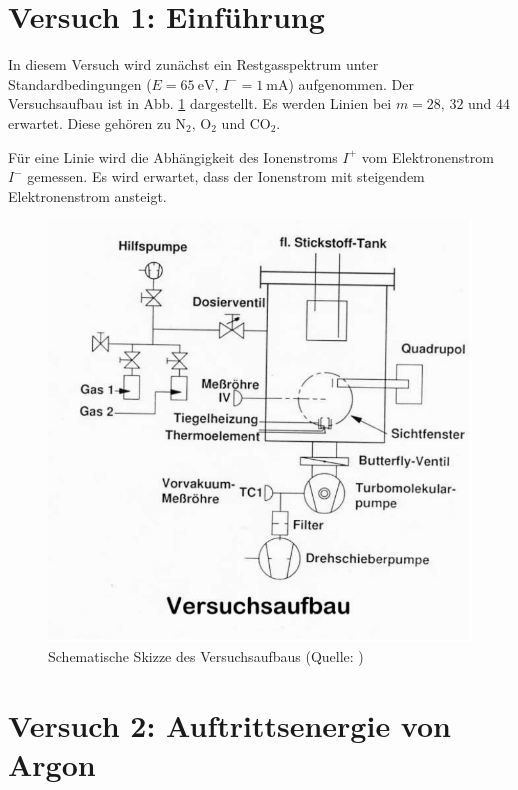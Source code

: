 \section{Versuch 1: Einführung}

In diesem Versuch wird zunächst ein Restgasspektrum unter Standardbedingungen ($E=\SI{65}{\electronvolt}, \, I^{-}=\SI{1}{\milli\ampere}$) aufgenommen. Der Versuchsaufbau ist in Abb. \ref{fig0v11} dargestellt.
Es werden Linien bei $m=28,\, 32$ und $44$ erwartet. Diese gehören  zu $\textrm{N}_{2}, \, \textrm{O}_{2}$ und $\textrm{CO}_{2}$.

Für eine Linie wird die Abhängigkeit des Ionenstroms $I^{+}$ vom Elektronenstrom $I^{-}$ gemessen. Es wird erwartet, dass der Ionenstrom mit steigendem Elektronenstrom ansteigt.

\begin{figure}[tb]
 \centering
 \includegraphics[scale=0.5]{./fig/massenspek_aufbau.png}
 \caption{Schematische Skizze des Versuchsaufbaus (Quelle: \cite[S. 4]{Litmap})}
 \label{fig0v11}
\end{figure}

\section{Versuch 2: Auftrittsenergie von Argon}

